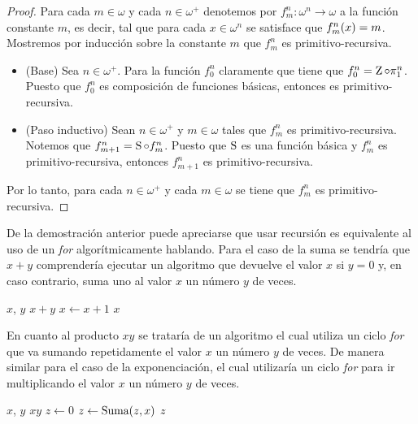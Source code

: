 \begin{proof}
	Para cada $m\in\omega$ y cada $n\in\omega^{+}$ denotemos por $f_{m}^{n}:\omega^{n}\to\omega$ a la función constante $m$, es decir, tal que para cada $x\in\omega^{n}$ se satisface que $f_{m}^{n}\pa*{x} = m$. Mostremos por inducción sobre la constante $m$ que $f_{m}^{n}$ es primitivo-recursiva.

	\begin{itemize}
		\item (Base) Sea $n\in\omega^{+}$. Para la función $f_{0}^{n}$ claramente que tiene que $f_{0}^{n} =\CERO\circ\PROYECCION{n}{1}$. Puesto que $f_{0}^{n}$ es composición de funciones básicas, entonces es primitivo-recursiva.
		\item (Paso inductivo) Sean $n\in\omega^{+}$ y $m\in\omega$ tales que $f_{m}^{n}$ es primitivo-recursiva. Notemos que $f_{m + 1}^{n} =\SUCESOR\circ f_{m}^{n}$. Puesto que $\SUCESOR$ es una función básica y $f_{m}^{n}$ es primitivo-recursiva, entonces $f_{m + 1}^{n}$ es primitivo-recursiva.
	\end{itemize}

	Por lo tanto, para cada $n\in\omega^{+}$ y cada $m\in\omega$ se tiene que $f_{m}^{n}$ es primitivo-recursiva.
\end{proof}

De la demostración anterior puede apreciarse que usar recursión es equivalente al uso de un \emph{for} algorítmicamente hablando. Para el caso de la suma se tendría que $x + y$ comprendería ejecutar un algoritmo que devuelve el valor $x$ si $y = 0$ y, en caso contrario, suma uno al valor $x$ un número $y$ de veces.

\begin{algorithm}[h!]
	\caption{Suma}

	\begin{algorithmic}
		\Require $x$, $y$
		\Ensure $x + y$
		\State $x\gets x + 1$
		\EndFor
		\State \Return $x$
	\end{algorithmic}
\end{algorithm}

En cuanto al producto $xy$ se trataría de un algoritmo el cual utiliza un ciclo \emph{for} que va sumando repetidamente el valor $x$ un número $y$ de veces. De manera similar para el caso de la exponenciación, el cual utilizaría un ciclo \emph{for} para ir multiplicando el valor $x$ un número $y$ de veces.

\begin{algorithm}[h!]
	\caption{Producto}

	\begin{algorithmic}
		\Require $x$, $y$
		\Ensure $xy$
		\State $z\gets 0$
		\For{$n = 0,\dotsc, y - 1$}
		\State $z\gets\text{Suma}\pa*{z, x}$
		\EndFor
		\State \Return $z$
	\end{algorithmic}
\end{algorithm}

